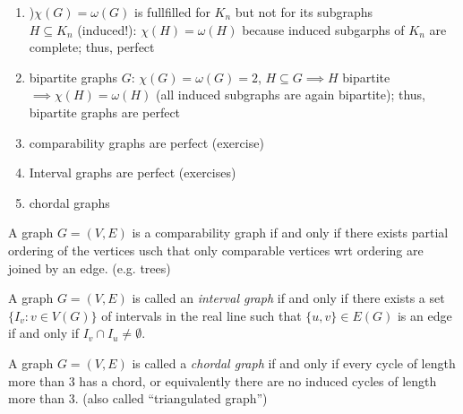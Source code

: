 \documentclass[aagt.tex]{subfiles}
\begin{document}
\begin{ex}
  \begin{enumerate}
    \item )$\chi(G) = \omega(G)$ is fullfilled for $K_n$ but not for its subgraphs\\
  $H \subseteq K_n$ (induced!): $\chi(H) = \omega(H)$ because induced subgarphs of $K_n$ are complete; thus, perfect
    \item bipartite graphs $G$: $\chi(G) = \omega(G) = 2$, $H \subseteq G \implies H$ bipartite $\implies \chi(H) = \omega(H)$ (all induced subgraphs are again bipartite); thus, bipartite graphs are perfect
    \item comparability graphs are perfect (exercise)
    \item Interval graphs are perfect (exercises)
    \item chordal graphs
  \end{enumerate}
\end{ex}

\begin{defi*}
  A graph $G=(V,E)$ is a comparability graph if and only if there exists partial ordering of the vertices usch that only comparable vertices wrt ordering are joined by an edge. (e.g. trees)
\end{defi*}

\begin{defi*}
  A graph $G=(V,E)$ is called an \emph{interval graph} if and only if there exists a set $\{I_v: v \in V(G)\}$ of intervals in the real line such that $\{u,v\} \in E(G)$ is an edge if and only if $I_v \cap I_u \neq \emptyset$.
\end{defi*}

\begin{defi*}
  A graph $G=(V,E)$ is called a \emph{chordal graph} if and only if every cycle of length more than 3 has a chord, or equivalently there are no induced cycles of length more than 3. (also called \enquote{triangulated graph})
\end{defi*}
\end{document}
